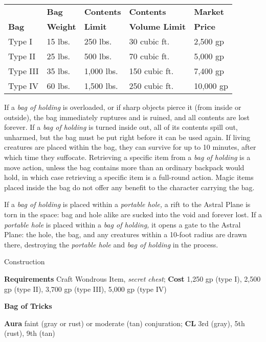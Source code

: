 \setlength{\tabcolsep}{1pt}
\begin{tabular}{lllll}
             & \textbf{Bag}    & \textbf{Contents}& \textbf{Contents}     & \textbf{Market} \\
\textbf{Bag} & \textbf{Weight} & \textbf{Limit}   & \textbf{Volume Limit} & \textbf{Price}\\
Type I & 15 lbs. & 250 lbs. & 30 cubic ft. & 2,500 gp\\
Type II & 25 lbs. & 500 lbs. & 70 cubic ft. & 5,000 gp\\
Type III & 35 lbs. & 1,000 lbs. & 150 cubic ft. & 7,400 gp\\
Type IV & 60 lbs. & 1,500 lbs. & 250 cubic ft. & 10,000 gp\\
\end{tabular}
				
If a \textit{bag of holding} is overloaded, or if sharp objects pierce it (from inside or outside), the bag immediately ruptures and is ruined, and all contents are lost forever. If a \textit{bag of holding }is turned inside out, all of its contents spill out, unharmed, but the bag must be put right before it can be used again. If living creatures are placed within the bag, they can survive for up to 10 minutes, after which time they suffocate. Retrieving a specific item from a \textit{bag of holding }is a move action, unless the bag contains more than an ordinary backpack would hold, in which case retrieving a specific item is a full-round action. Magic items placed inside the bag do not offer any benefit to the character carrying the bag.
				
If a \textit{bag of holding }is placed within a \textit{portable hole,} a rift to the Astral Plane is torn in the space: bag and hole alike are sucked into the void and forever lost. If a \textit{portable hole }is placed within a \textit{bag of holding, }it opens a gate to the Astral Plane: the hole, the bag, and any creatures within a 10-foot radius are drawn there, destroying the \textit{portable hole }and \textit{bag of holding }in the process. 
				
Construction
				
\textbf{Requirements} Craft Wondrous Item, \textit{secret chest}; \textbf{Cost }1,250 gp (type I), 2,500 gp (type II), 3,700 gp (type III), 5,000 gp (type IV)
				
\textbf{Bag of Tricks}
				
\textbf{Aura} faint (gray or rust) or moderate (tan) conjuration; \textbf{CL} 3rd (gray), 5th (rust), 9th (tan)
				
